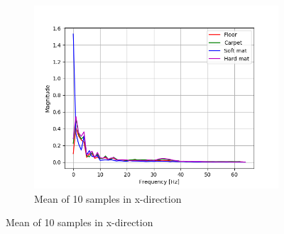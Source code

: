 \documentclass[USenglish]{ifimaster}  %
\begin{document}
	
	\begin{figure}[h]
		\centering
		\begin{subfigure}[b]{0.95\textwidth}
			\includegraphics[width=1\linewidth]{Figures/fftx}
			\caption{Mean of 10 samples in x-direction}
			\label{fig:fftx} 
		\end{subfigure}
	\end{figure}
\end{document}
